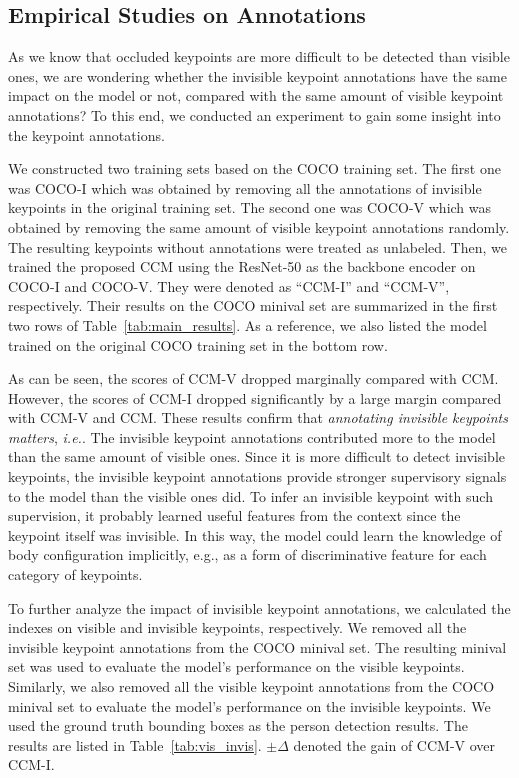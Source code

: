 \documentclass[twocolumn]{svjour3}          \smartqed  \usepackage{natbib}
\begin{document}
\subsection{Empirical Studies on Annotations}
\label{subsec:insight}
As we know that occluded keypoints are more difficult to be detected than visible ones, we are wondering whether the invisible keypoint annotations have the same impact on the model or not, compared with the same amount of visible keypoint annotations? To this end, we conducted an experiment to gain some insight into the keypoint annotations.

We constructed two training sets based on the COCO training set. The first one was COCO-I which was obtained by removing all the annotations of invisible keypoints in the original training set. The second one was COCO-V which was obtained by removing the same amount of visible keypoint annotations randomly. The resulting keypoints without annotations were treated as unlabeled. Then, we trained the proposed CCM using the ResNet-50 as the backbone encoder on COCO-I and COCO-V. They were denoted as ``CCM-I'' and ``CCM-V'', respectively. Their results on the COCO minival set are summarized in the first two rows of Table~\ref{tab:main_results}. As a reference, we also listed the model trained on the original COCO training set in the bottom row.

As can be seen, the scores of CCM-V dropped marginally compared with CCM. However, the scores of CCM-I dropped significantly by a large margin compared with CCM-V and CCM. These results confirm that \emph{{annotating invisible keypoints matters}}, \emph{i.e.}. The invisible keypoint annotations contributed more to the model than the same amount of visible ones. Since it is more difficult to detect invisible keypoints, the invisible keypoint annotations provide stronger supervisory signals to the model than the visible ones did. To infer an invisible keypoint with such supervision, it probably learned useful features from the context since the keypoint itself was invisible. In this way, the model could learn the knowledge of body configuration implicitly, e.g., as a form of discriminative feature for each category of keypoints.

To further analyze the impact of invisible keypoint annotations, we calculated the indexes on visible and invisible keypoints, respectively. We removed all the invisible keypoint annotations from the COCO minival set. The resulting minival set was used to evaluate the model's performance on the visible keypoints. Similarly, we also removed all the visible keypoint annotations from the COCO minival set to evaluate the model's performance on the invisible keypoints. We used the ground truth bounding boxes as the person detection results. The results are listed in Table~\ref{tab:vis_invis}. $\pm \Delta$ denoted the gain of CCM-V over CCM-I.
\end{document}
